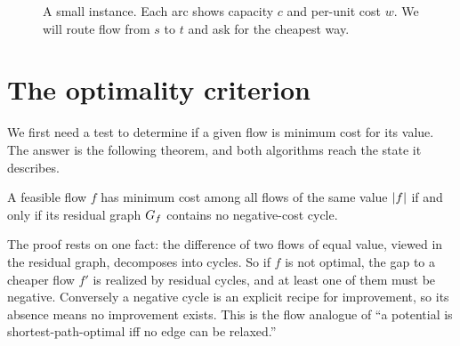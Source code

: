\begin{figure}[H]
\centering
{}
\caption{A small instance. Each arc shows capacity $c$ and per-unit cost $w$. We will route flow from $s$ to $t$ and ask for the cheapest way.}
\label{ch14:fig-instance}
\end{figure}

\section{The optimality criterion}
\label{ch14:optimality}

We first need a test to determine if a given flow is minimum cost for its value. The answer is the following theorem, and both algorithms reach the state it describes.

\begin{theorem}\label{ch14:thm-negcycle}
A feasible flow $f$ has minimum cost among all flows of the same value $\lvert f\rvert$ if and only if its residual graph $G_f$ contains no negative-cost cycle.
\end{theorem}

\begin{whybox}
The proof rests on one fact: the difference of two flows of equal value, viewed in the residual graph, decomposes into cycles. So if $f$ is not optimal, the gap to a cheaper flow $f'$ is realized by residual cycles, and at least one of them must be negative. Conversely a negative cycle is an explicit recipe for improvement, so its absence means no improvement exists. This is the flow analogue of ``a potential is shortest-path-optimal iff no edge can be relaxed.''
\end{whybox}

